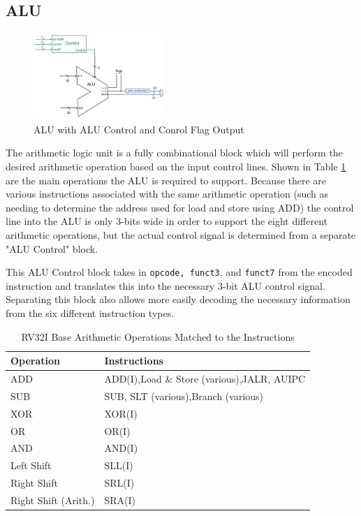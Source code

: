 \documentclass[lettersize,journal]{IEEEtran}
\begin{document}
\begin{itemize}
\subsection{ALU}
\begin{figure}[!h]
    \label{fig:alublock}
    \centering
    \includegraphics[width=5cm]{CPTR380_ALU.png}
    \caption{ALU with ALU Control and Conrol Flag Output}
\end{figure}
The arithmetic logic unit is a fully combinational block which will perform the desired arithmetic operation based on the input control lines.
Shown in Table \ref{table:ALUOps} are the main operations the ALU is required to support. Because there are various instructions associated with the same
arithmetic operation (such as needing to determine the address used for load and store using ADD) the control line into the ALU is only 3-bits wide in order to support
the eight different arithmetic operations, but the actual control signal is determined from a separate "ALU Control" block.

This ALU Control block takes in \verb|opcode, funct3|, and \verb|funct7| from the encoded instruction and translates this into the necessary 3-bit ALU control signal.
Separating this block also allows more easily decoding the necessary information from the six different \cite{riscvunprovisioned} instruction types.
\begin{table}
    \label{table:ALUOps}
    \centering
    \begin{tabular}{|p{2.7cm}|p{4cm}|}
        \hline
        Operation & Instructions \\
        \hline\hline
        ADD & ADD(I),\newline Load \& Store (various),\newline JALR, AUIPC\\
        SUB & SUB, SLT (various),\newline Branch (various)\\
        XOR & XOR(I)\\
        OR & OR(I)\\
        AND & AND(I)\\
        Left Shift & SLL(I)\\
        Right Shift & SRL(I)\\
        Right Shift (Arith.) & SRA(I)\\
        \hline
    \end{tabular}
    \caption{RV32I Base Arithmetic Operations Matched to the Instructions}
\end{table}


\end{itemize}
\end{document}
